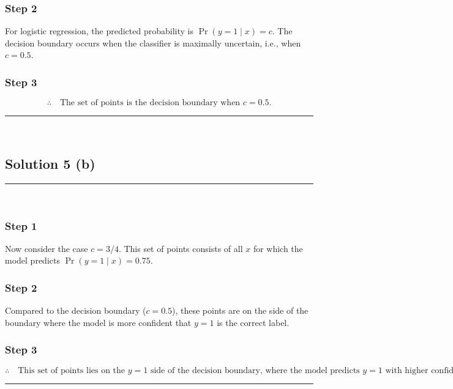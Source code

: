 \documentclass{article}
\begin{document}
\subsubsection*{Step 2}
\parbox{\textwidth}{
For logistic regression, the predicted probability is $\operatorname{Pr}(y=1 \mid x) = c$. The decision boundary occurs when the classifier is maximally uncertain, i.e., when $c = 0.5$.
}

\subsubsection*{Step 3}
\parbox{\textwidth}{
\[
\therefore \quad \text{The set of points is the decision boundary when } c = 0.5.
\]
}

\noindent\rule{\textwidth}{0.4pt}\\

\newpage

\subsection*{Solution 5 (b)}
\noindent\rule{\textwidth}{0.4pt}\\

\subsubsection*{Step 1}
\parbox{\textwidth}{
Now consider the case $c = 3/4$. This set of points consists of all $x$ for which the model predicts $\operatorname{Pr}(y=1 \mid x) = 0.75$.
}

\subsubsection*{Step 2}
\parbox{\textwidth}{
Compared to the decision boundary ($c = 0.5$), these points are on the side of the boundary where the model is more confident that $y=1$ is the correct label.
}

\subsubsection*{Step 3}
\parbox{\textwidth}{
\[
\therefore \quad \text{This set of points lies on the $y=1$ side of the decision boundary, where the model predicts $y=1$ with higher confidence.}
\]
}

\noindent\rule{\textwidth}{0.4pt}\\

\newpage
\end{document}
